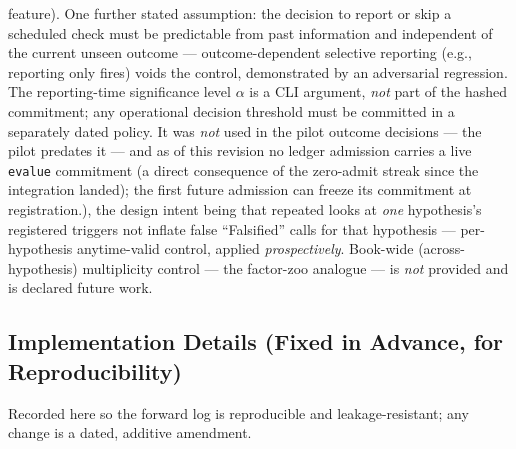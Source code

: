 \documentclass[11pt]{article}
\begin{document}
\begin{itemize}
{    feature). One further stated assumption:
    the decision to report or skip a scheduled check must be predictable from past information and
    independent of the current unseen outcome --- outcome-dependent selective reporting (e.g.,
    reporting only fires) voids the control, demonstrated by an adversarial regression.
    The reporting-time significance level $\alpha$ is a CLI argument, \emph{not} part of the hashed
    commitment; any operational decision threshold must be committed in a separately dated policy.
    It was \emph{not} used in the pilot outcome decisions --- the pilot predates it --- and as of this
    revision no ledger admission carries a live \texttt{evalue} commitment (a direct consequence of
    the zero-admit streak since the integration landed); the first future admission can freeze its
    commitment at registration.}),
    the design intent being that repeated looks at \emph{one} hypothesis's registered triggers not
    inflate false ``Falsified'' calls for that hypothesis --- per-hypothesis anytime-valid control,
    applied \emph{prospectively}. Book-wide
    (across-hypothesis) multiplicity control --- the
    factor-zoo analogue --- is \emph{not} provided and is declared future work.
\end{itemize}

\subsection*{Implementation Details (Fixed in Advance, for Reproducibility)}

Recorded here so the forward log is reproducible and leakage-resistant; any change is a dated,
additive amendment.
\end{document}

